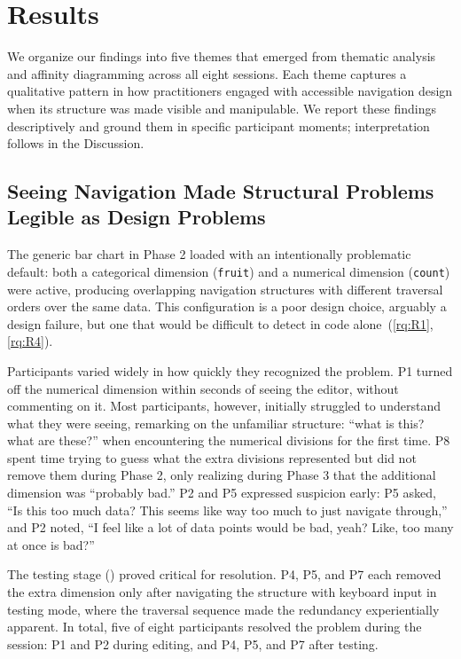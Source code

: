 \documentclass[12pt]{cmuthesis}
\begin{document}
\section{Results}
\label{sec:skelly-results}

We organize our findings into five themes that emerged from thematic analysis and affinity diagramming across all eight sessions. Each theme captures a qualitative pattern in how practitioners engaged with accessible navigation design when its structure was made visible and manipulable. We report these findings descriptively and ground them in specific participant moments; interpretation follows in the Discussion.

\subsection{Seeing Navigation Made Structural Problems Legible as Design Problems}
\label{sec:results-legible}

The generic bar chart in Phase 2 loaded with an intentionally problematic default: both a categorical dimension (\texttt{fruit}) and a numerical dimension (\texttt{count}) were active, producing overlapping navigation structures with different traversal orders over the same data. This configuration is a poor design choice, arguably a design failure, but one that would be difficult to detect in code alone~(\ref{rq:R1}, \ref{rq:R4}).

Participants varied widely in how quickly they recognized the problem. P1 turned off the numerical dimension within seconds of seeing the editor, without commenting on it. Most participants, however, initially struggled to understand what they were seeing, remarking on the unfamiliar structure: ``what is this? what are these?'' when encountering the numerical divisions for the first time. P8 spent time trying to guess what the extra divisions represented but did not remove them during Phase 2, only realizing during Phase 3 that the additional dimension was ``probably bad.'' P2 and P5 expressed suspicion early: P5 asked, ``Is this too much data? This seems like way too much to just navigate through,'' and P2 noted, ``I feel like a lot of data points would be bad, yeah? Like, too many at once is bad?''


The testing stage () proved critical for resolution. P4, P5, and P7 each removed the extra dimension only after navigating the structure with keyboard input in testing mode, where the traversal sequence made the redundancy experientially apparent. In total, five of eight participants resolved the problem during the session: P1 and P2 during editing, and P4, P5, and P7 after testing.
\end{document}
